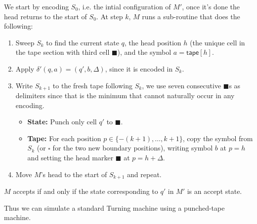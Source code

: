 \documentclass[12pt]{article}
\begin{document}
\begin{solution}
    We start by encoding $S_0$, i.e. the intial configuration of $M'$, once it's done the head returns to the start of $S_0$. At step $k$, $M$ runs a sub-routine that does the following: 
    \begin{enumerate}
        \item Sweep $S_k$ to find the current state $q$, the head position $h$ (the unique cell in the tape section with third cell $\blacksquare$), and the symbol $a = \mathsf{tape}[h]$.
        \item Apply $\delta'(q, a) = (q', b, \Delta)$, since it is encoded in $S_k$. 
        \item Write $S_{k+1}$ to the fresh tape following $S_k$, we use seven consecutive $\blacksquare$s as delimiters since that is the minimum that cannot naturally occur in any encoding. 
        \begin{itemize}
            \item \textbf{State:} Punch only cell $q'$ to $\blacksquare$.
            \item \textbf{Tape:} For each position $p \in \{-(k+1), \ldots, k+1\}$, copy the symbol from $S_k$ (or $\square$ for the two new boundary positions), writing symbol $b$ at $p = h$ and setting the head marker $\blacksquare$ at $p = h + \Delta$.
        \end{itemize}
        \item Move $M$'s head to the start of $S_{k+1}$ and repeat.
    \end{enumerate}
    $M$ accepts if and only if the state corresponding to $q'$ in $M'$ is an accept state.

    Thus we can simulate a standard Turning machine using a punched-tape machine. 
\end{solution}
\end{document}
